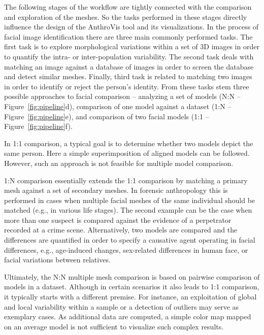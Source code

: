 \documentclass[final,5p,times]{elsarticle}
\begin{document}
The following stages of the workflow are tightly connected with the comparison and exploration of the meshes.
So the tasks performed in these stages directly influence the design of the AnthroVis tool and its visualizations.
In the process of facial image identification there are three main commonly performed tasks.
The first task is to explore morphological variations within a set of 3D images in order to quantify the intra- or inter-population variability.
The second task deals with matching an image against a database of images in order to screen the database and detect similar meshes.
Finally, third task is related to matching two images in order to identify or reject the person's identity.
From these tasks stem three possible approaches to facial comparison -- analyzing a set of models (N:N -- Figure~\ref{fig:pipeline}d), comparison of one model against a dataset (1:N -- Figure~\ref{fig:pipeline}e), and comparison of two facial models (1:1 -- Figure~\ref{fig:pipeline}f). 

In 1:1 comparison, a typical goal is to determine whether two models depict the same person. 
Here a simple superimposition of aligned models can be followed.
However, such an approach is not feasible for multiple model comparison.

1:N comparison essentially extends the 1:1 comparison by matching a primary mesh against a set of secondary meshes. 
In forensic anthropology this is performed in cases when multiple facial meshes of the same individual should be matched (e.g., in various life stages).
The second example can be the case when more than one suspect is compared against the evidence of a perpetrator recorded at a crime scene. 
Alternatively, two models are compared and the differences are quantified in order to specify a causative agent operating in facial differences, e.g., age-induced changes, sex-related differences in human face, or facial variations between relatives.

Ultimately, the N:N multiple mesh comparison is based on pairwise comparison of models in a dataset. 
Although in certain scenarios it also leads to 1:1 comparison, it typically starts with a different premise.
For instance, an exploitation of global and local variability within a sample or a detection of outliers may serve as exemplary cases.
As additional data are computed, a simple color map mapped on an average model is not sufficient to visualize such complex results.
\end{document}
